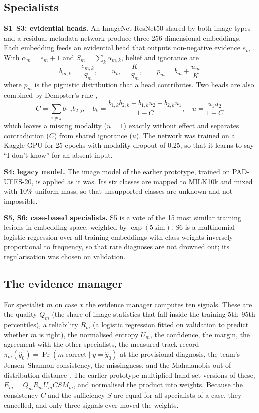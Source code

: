 \documentclass[conference]{IEEEtran}
\begin{document}
\subsection{Specialists}
\textbf{S1--S3: evidential heads.} An ImageNet ResNet50 \cite{r9} shared by both image types and a residual metadata network produce three 256-dimensional embeddings. Each embedding feeds an evidential head that outputs non-negative evidence $e_{m}$ \cite{r14}. With $\alpha_{m}=e_{m}+1$ and $S_{m}=\sum_{k}\alpha_{m,k}$, belief and ignorance are
\begin{equation}
b_{m,k}=\frac{e_{m,k}}{S_m},\qquad u_m=\frac{K}{S_m},\qquad p_m=b_m+\frac{u_m}{K}
\label{eq:belief}
\end{equation}
where $p_m$ is the pignistic distribution that a head contributes. Two heads are also combined by Dempster's rule \cite{r16},
\begin{equation}
C=\sum_{i\neq j}b_{1,i}b_{2,j},\quad
b_k=\frac{b_{1,k}b_{2,k}+b_{1,k}u_2+b_{2,k}u_1}{1-C},\quad
u=\frac{u_1u_2}{1-C}
\label{eq:ds}
\end{equation}
which leaves a missing modality ($u=1$) exactly without effect and separates contradiction ($C$) from shared ignorance ($u$). The network was trained on a Kaggle GPU for 25 epochs with modality dropout of 0.25, so that it learns to say ``I don't know'' for an absent input.

\textbf{S4: legacy model.} The image model of the earlier prototype, trained on PAD-UFES-20, is applied as it was. Its six classes are mapped to MILK10k and mixed with 10\% uniform mass, so that unsupported classes are unknown and not impossible.

\textbf{S5, S6: case-based specialists.} S5 is a vote of the 15 most similar training lesions in embedding space, weighted by $\exp(5\,\mathrm{sim})$. S6 is a multinomial logistic regression over all training embeddings with class weights inversely proportional to frequency, so that rare diagnoses are not drowned out; its regularisation was chosen on validation.

\subsection{The evidence manager}
For specialist $m$ on case $x$ the evidence manager computes ten signals. These are the quality $Q_m$ (the share of image statistics that fall inside the training 5th--95th percentiles), a reliability $R_m$ (a logistic regression fitted on validation to predict whether $m$ is right), the normalised entropy $U_m$, the confidence, the margin, the agreement with the other specialists, the measured track record $\pi_m(\hat y_0)=\Pr(m\ \mathrm{correct}\mid y=\hat y_0)$ at the provisional diagnosis, the team's Jensen--Shannon consistency, the missingness, and the Mahalanobis out-of-distribution distance \cite{r19}. The earlier prototype multiplied hand-set versions of these, $E_m=Q_mR_mU_mCSM_m$, and normalised the product into weights. Because the consistency $C$ and the sufficiency $S$ are equal for all specialists of a case, they cancelled, and only three signals ever moved the weights.
\end{document}
